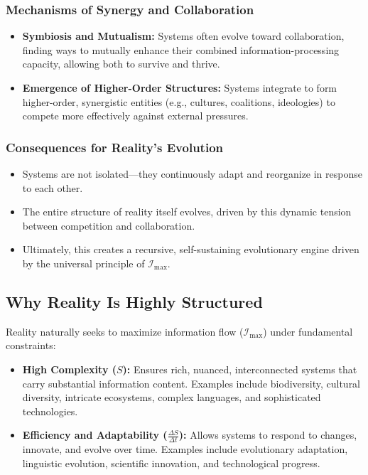 \documentclass[12pt]{article}
\begin{document}
\subsubsection{Mechanisms of Synergy and Collaboration}
\begin{itemize}
    \item \textbf{Symbiosis and Mutualism:}  
    Systems often evolve toward collaboration, finding ways to mutually enhance their combined information-processing capacity, allowing both to survive and thrive.
    \item \textbf{Emergence of Higher-Order Structures:}  
    Systems integrate to form higher-order, synergistic entities (e.g., cultures, coalitions, ideologies) to compete more effectively against external pressures.
\end{itemize}

\subsubsection{Consequences for Reality’s Evolution}
\begin{itemize}
    \item Systems are not isolated—they continuously adapt and reorganize in response to each other.
    \item The entire structure of reality itself evolves, driven by this dynamic tension between competition and collaboration.
    \item Ultimately, this creates a recursive, self-sustaining evolutionary engine driven by the universal principle of \( \mathcal{I}_{\text{max}} \).
\end{itemize}

\subsection{Why Reality Is Highly Structured}

Reality naturally seeks to maximize information flow (\(\mathcal{I}_{\text{max}}\)) under fundamental constraints:

\begin{itemize}
    \item \textbf{High Complexity (\(S\)):}  
    Ensures rich, nuanced, interconnected systems that carry substantial information content. Examples include biodiversity, cultural diversity, intricate ecosystems, complex languages, and sophisticated technologies.
    \item \textbf{Efficiency and Adaptability (\(\frac{\Delta S}{\Delta t}\)):}  
    Allows systems to respond to changes, innovate, and evolve over time. Examples include evolutionary adaptation, linguistic evolution, scientific innovation, and technological progress.
\end{itemize}
\end{document}
